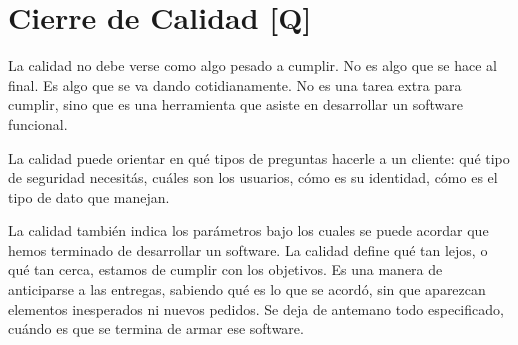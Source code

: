 \hypertarget{cierre-de-calidad-q}{%
\section{Cierre de Calidad {[}Q{]}}\label{cierre-de-calidad-q}}

La calidad no debe verse como algo pesado a cumplir. No es algo que se
hace al final. Es algo que se va dando cotidianamente. No es una tarea
extra para cumplir, sino que es una herramienta que asiste en
desarrollar un software funcional.

La calidad puede orientar en qué tipos de preguntas hacerle a un
cliente: qué tipo de seguridad necesitás, cuáles son los usuarios, cómo
es su identidad, cómo es el tipo de dato que manejan.

La calidad también indica los parámetros bajo los cuales se puede
acordar que hemos terminado de desarrollar un software. La calidad
define qué tan lejos, o qué tan cerca, estamos de cumplir con los
objetivos. Es una manera de anticiparse a las entregas, sabiendo qué es
lo que se acordó, sin que aparezcan elementos inesperados ni nuevos
pedidos. Se deja de antemano todo especificado, cuándo es que se termina
de armar ese software.

\onecolumn
